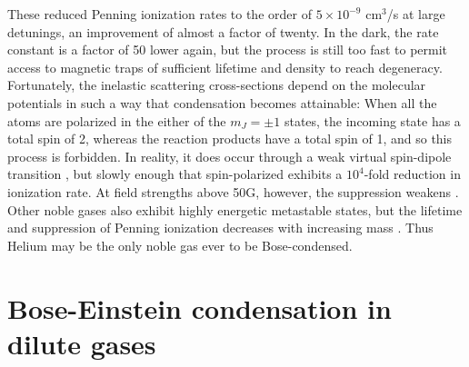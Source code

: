 	These reduced Penning ionization rates to the order of $5\times10^{-9}$ cm$^3$/s at large detunings, an improvement of almost a factor of twenty.
	In the dark, the rate constant is a factor of 50 lower again, but the process is  still too fast to permit access to magnetic traps of sufficient lifetime and density to reach degeneracy.
	Fortunately, the inelastic scattering cross-sections depend on the molecular potentials in such a way that condensation becomes attainable: When all the atoms are polarized in the either of the $m_J=\pm1$ states, the incoming state has a total spin of 2, whereas the reaction products have a total spin of 1, and so this process is forbidden.
	In reality, it does occur through a weak virtual spin-dipole transition \cite{shlyapnikov94} , but slowly enough that spin-polarized \mhe exhibits a $10^4$-fold reduction in ionization rate.
	At field strengths above 50G, however, the suppression weakens \cite{shlyapnikov94,Borbely12}.
	Other noble gases also exhibit highly energetic metastable states, but the lifetime and suppression of Penning ionization decreases with increasing mass \cite{orzel99, spoden05}.
	Thus Helium may be the only noble gas ever to be Bose-condensed.
	

	
	
	

\section{Bose-Einstein condensation in dilute gases}

